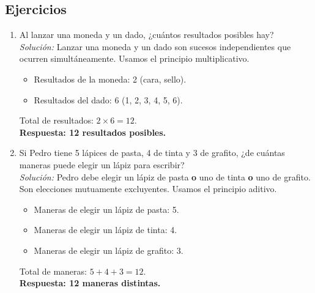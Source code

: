 \documentclass[12pt, letterpaper]{article}
\begin{document}
\subsection{Ejercicios}
\begin{enumerate}
    \item Al lanzar una moneda y un dado, ¿cuántos resultados posibles hay? \\
    \textit{Solución:}
    Lanzar una moneda y un dado son sucesos independientes que ocurren simultáneamente. Usamos el principio multiplicativo.
    \begin{itemize}
        \item Resultados de la moneda: 2 (cara, sello).
        \item Resultados del dado: 6 (1, 2, 3, 4, 5, 6).
    \end{itemize}
    Total de resultados: $2 \times 6 = 12$. \\
    \textbf{Respuesta: 12 resultados posibles.}

    \item Si Pedro tiene 5 lápices de pasta, 4 de tinta y 3 de grafito, ¿de cuántas maneras puede elegir un lápiz para escribir? \\
    \textit{Solución:}
    Pedro debe elegir un lápiz de pasta \textbf{o} uno de tinta \textbf{o} uno de grafito. Son elecciones mutuamente excluyentes. Usamos el principio aditivo.
    \begin{itemize}
        \item Maneras de elegir un lápiz de pasta: 5.
        \item Maneras de elegir un lápiz de tinta: 4.
        \item Maneras de elegir un lápiz de grafito: 3.
    \end{itemize}
    Total de maneras: $5 + 4 + 3 = 12$. \\
    \textbf{Respuesta: 12 maneras distintas.}


\end{enumerate}
\end{document}
